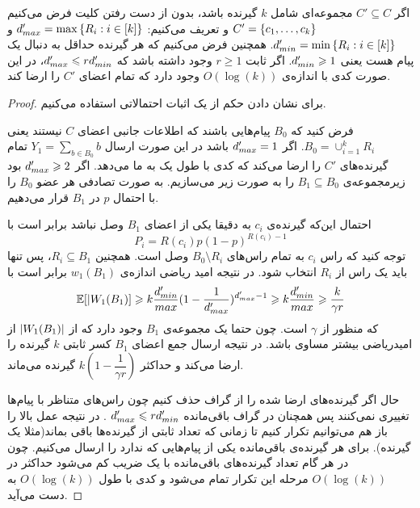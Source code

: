 \begin{lemma}
	\label{lemma:pliable2015:3}
	اگر
	$C' \subseteq C$
	مجموعه‌ای شامل 
	$k$
	گیرنده‌ باشد، بدون از دست رفتن کلیت فرض می‌کنیم
	$C' = \left\{ c_1, \ldots, c_k \right\}$
	و تعریف می‌کنیم:
	$d_{max}' = \max\left\{ R_i: i \in [k]  \right\}$
	و
	$d_{min}' = \min\left\{ R_i: i \in [k]  \right\}$.
 همچنین فرض می‌کنیم که هر گیرنده حداقل به دنبال یک پیام هست یعنی
	$d_{min}' \geqslant 1$. 
 اگر ثابت
	$r \geq 1$
	وجود داشته باشد که
	$d_{max}' \leqslant r d_{min}'$،
	در این صورت کدی با اندازه‌ی
	$O(\log(k))$
	وجود دارد که تمام اعضای
	$C'$
	را ارضا کند.
\end{lemma}
\begin{proof}
	برای نشان دادن حکم از یک اثبات احتمالاتی استفاده می‌کنیم.
	
	فرض کنید که
	$B_0$
	پیام‌هایی باشند که اطلاعات جانبی اعضای
	$C$
	نیستند یعنی
	$B_0 = \cup_{i = 1}^{k} R_i$.
	اگر
	$d_{max}' = 1$
	باشد در این صورت ارسال
	$Y_1 = \sum_{b \in B_0} b$
	تمام گیرنده‌های
	$C'$
	را ارضا می‌کند که کدی با طول یک به ما می‌دهد. اگر
	$d_{max}' \geqslant 2$
	بود زیرمجموعه‌ی
	$B_1 \subseteq B_0$
	را به صورت زیر می‌سازیم. به صورت تصادفی هر عضو
	$B_0$
	را با احتمال
	$p$
	در 
	$B_1$
	قرار می‌دهیم.
	
	احتمال این‌که گیرنده‌ی
	$c_i$
	به دقیقا یکی از اعضای 
	$B_1$
	وصل نباشد برابر است با
	$$P_i = R(c_i) p (1 - p)^{R(c_i) - 1}$$
	توجه کنید که راس
	$c_i$
	به تمام راس‌های
	$B_0 \setminus R_i$
	وصل است. همچنین
	$R_i \subseteq B_1$،
	 پس تنها باید یک راس از
	$R_i$
	انتخاب شود. در نتیجه امید ریاضی اندازه‌ی
	$w_1(B_1)$
	برابر است با
	\begin{equation}
		\mathbb{E}[|W_1(B_1)] \geqslant k \dfrac{d_{min}'}{max}(1 - \dfrac{1}{d_{max}'})^{d_{max}' - 1} \geqslant k \dfrac{d_{min}'}{max} \geqslant \dfrac{k}{\gamma r}
	\end{equation}
	که منظور از
	$\gamma$
	است. چون حتما یک مجموعه‌ی
	$B_1$
	وجود دارد که از 
	$\left|{W_1(B_1)}\right|$
	از امیدریاضی بیشتر مساوی باشد. در نتیجه ارسال جمع اعضای
	$B_1$
	کسر ثابتی
	$k$
	گیرنده‌ را ارضا می‌کند و حداکثر
	$k(1 - \dfrac{1}{\gamma r})$
	گیرنده می‌ماند.
	
	حال اگر گیرنده‌های ارضا شده را از گراف حذف کنیم چون راس‌های متناظر با پیام‌ها تغییری نمی‌کنند پس همچنان در گراف باقی‌مانده
	$d_{max}' \leqslant r d_{min}'$
	. در نتیجه عمل بالا را باز هم می‌توانیم تکرار کنیم تا زمانی که تعداد ثابتی از گیرنده‌ها باقی بماند(مثلا یک گیرنده). برای هر گیرنده‌ی باقی‌مانده یکی از پیام‌هایی که ندارد را ارسال می‌کنیم. چون در هر گام تعداد گیرنده‌های باقی‌مانده با یک ضریب کم می‌شود حداکثر در
	$O(\log(k))$
	مرحله این تکرار تمام می‌شود و کدی با طول
	$O(\log(k))$
	به دست می‌آید.
\end{proof}

